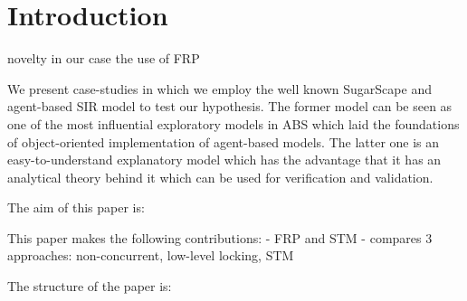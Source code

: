 \section{Introduction}
novelty in our case the use of FRP

We present case-studies in which we employ the well known SugarScape \citep{epstein_growing_1996} and agent-based SIR \citep{macal_agent-based_2010} model to test our hypothesis. The former model can be seen as one of the most influential exploratory models in ABS which laid the foundations of object-oriented implementation of agent-based models. The latter one is an easy-to-understand explanatory model which has the advantage that it has an analytical theory behind it which can be used for verification and validation.

The aim of this paper is: 

This paper makes the following contributions:
- FRP and STM
- compares 3 approaches: non-concurrent, low-level locking, STM

The structure of the paper is:
